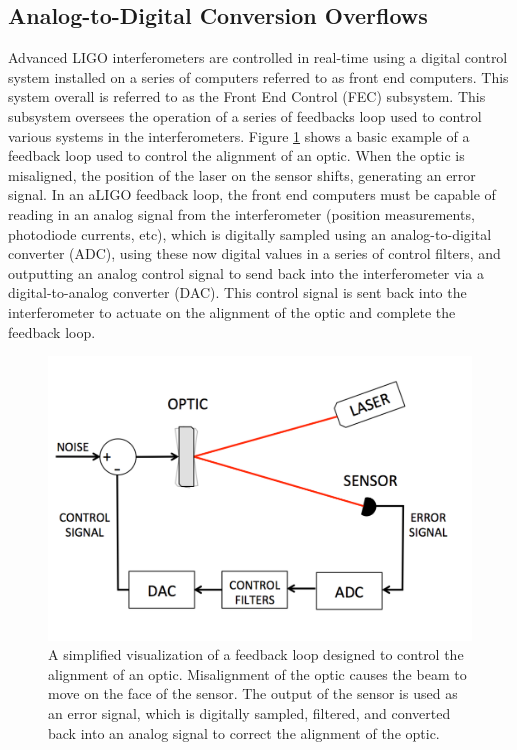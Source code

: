 \subsection{Analog-to-Digital Conversion Overflows}\label{sec:adc-overflow}

Advanced LIGO interferometers are controlled in real-time using a digital 
control system installed on a series of computers referred to as front end 
computers.  This system overall is referred to as the Front End Control 
(FEC) subsystem. This 
subsystem oversees the operation of a series of feedbacks loop used to control 
various systems in the interferometers.  
Figure \ref{fig:control-loop} shows a basic example of a feedback loop 
used to control the alignment of an optic. When the optic is misaligned, 
the position of the laser on the sensor shifts, generating an error signal. 
In an aLIGO feedback loop, the front end computers must be capable of reading in an 
analog signal from the interferometer (position measurements, photodiode currents, etc), 
which is digitally sampled using an 
analog-to-digital converter (ADC), using these now 
digital values in a series of control filters, and outputting an analog 
control signal to send back into the interferometer via a digital-to-analog 
converter (DAC). This control signal is sent back into the interferometer 
to actuate on the alignment of the optic and complete the feedback loop.

\begin{figure}[ht!]
\includegraphics[width=\textwidth]{figures/detchar/control-loop}
\caption[Example of a feedback loop]{A simplified visualization of a feedback %
         loop designed to control the alignment of an optic. Misalignment of %
         the optic causes the beam to move on the face of the sensor. The %
         output of the sensor is used as an error signal, which is digitally %
         sampled, filtered, and converted back into an analog signal to correct %
         the alignment of the optic.}
\label{fig:control-loop}
\end{figure}

